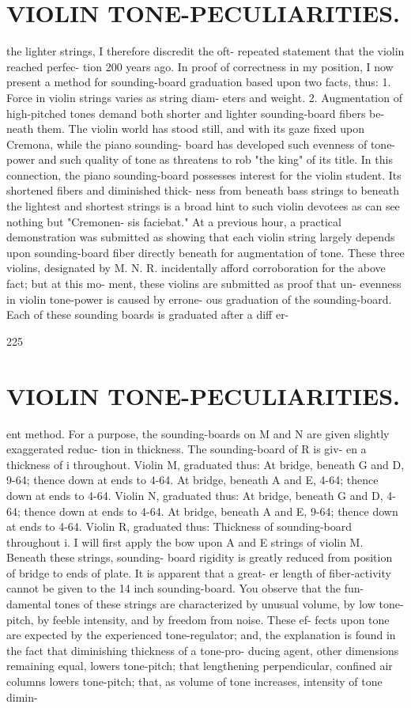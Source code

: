 \documentclass{article}
\begin{document}
\section*{VIOLIN TONE-PECULIARITIES.}
the lighter strings, I therefore discredit the oft- repeated statement that the violin reached perfec- tion 200 years ago. In proof of correctness in my position, I now present a method for sounding-board graduation based upon two facts, thus: 1. Force in violin strings varies as string diam- eters and weight. 2. Augmentation of high-pitched tones demand both shorter and lighter sounding-board fibers be- neath them. The violin world has stood still, and with its gaze fixed upon Cremona, while the piano sounding- board has developed such evenness of tone-power and such quality of tone as threatens to rob "the king" of its title. In this connection, the piano sounding-board possesses interest for the violin student. Its shortened fibers and diminished thick- ness from beneath bass strings to beneath the lightest and shortest strings is a broad hint to such violin devotees as can see nothing but "Cremonen- sis faciebat." At a previous hour, a practical demonstration was submitted as showing that each violin string largely depends upon sounding-board fiber directly beneath for augmentation of tone. These three violins, designated by M. N. R. incidentally afford corroboration for the above fact; but at this mo- ment, these violins are submitted as proof that un- evenness in violin tone-power is caused by errone- ous graduation of the sounding-board. Each of these sounding boards is graduated after a diff er-

225

\section*{VIOLIN TONE-PECULIARITIES.}
ent method. For a purpose, the sounding-boards on M and N are given slightly exaggerated reduc- tion in thickness. The sounding-board of R is giv- en a thickness of i throughout. Violin M, graduated thus: At bridge, beneath G and D, 9-64; thence down at ends to 4-64. At bridge, beneath A and E, 4-64; thence down at ends to 4-64. Violin N, graduated thus: At bridge, beneath G and D, 4-64; thence down at ends to 4-64. At bridge, beneath A and E, 9-64; thence down at ends to 4-64. Violin R, graduated thus: Thickness of sounding-board throughout i. I will first apply the bow upon A and E strings of violin M. Beneath these strings, sounding- board rigidity is greatly reduced from position of bridge to ends of plate. It is apparent that a great- er length of fiber-activity cannot be given to the 14 inch sounding-board. You observe that the fun- damental tones of these strings are characterized by unusual volume, by low tone-pitch, by feeble intensity, and by freedom from noise. These ef- fects upon tone are expected by the experienced tone-regulator; and, the explanation is found in the fact that diminishing thickness of a tone-pro- ducing agent, other dimensions remaining equal, lowers tone-pitch; that lengthening perpendicular, confined air columns lowers tone-pitch; that, as volume of tone increases, intensity of tone dimin-
\end{document}
